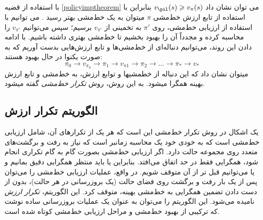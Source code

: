 با استفاده از قضیه \ref{policyimptheorem} می توان نشان داد
 $v_\pil(s) \ge v_{\pi}(s)$
بنابراین با استفاده از تابع ارزش خط‌مشی $\pi$ می\nf توان به یک خط‌مشی بهتر رسید \cite{suttonbook}. می توانیم با استفاده از ارزیابی خط‌مشی، روی $\pi'$ به تخمینی از $v_{\pi'}$ برسیم؛ سپس می‌توانیم
$v_{\pi'}$
    را محاسبه کرده و مجدداً آن را بهبود بخشیم تا خط‌مشی بهتری داشته باشیم. با ادامه دادن این روند، می‌توانیم دنباله‌ای از خط‌مشی‌ها و تابع ارزش‌هایی بدست آوریم که به صورت یکنوا در حال بهبود هستند:
$$\pi_0 \longrightarrow v_{\pi_0} \longrightarrow \pi_1 \longrightarrow v_{\pi{1}} \longrightarrow \pi_2 \longrightarrow \dots \longrightarrow \pi_* \longrightarrow v_*$$
می\nf توان نشان داد که این دنباله از خط\nf مشی\nf ها و توابع ارزش، به خط‌مشی و تابع ارزش بهینه همگرا می\nf شود.
به این روش، روش \textit{تکرار خط‌مشی}  
گفته می\nf شود.
\subsection{الگوریتم تکرار ارزش}
یک اشکال در روش تکرار خط‌مشی این است که هر یک از تکرارهای آن، شامل ارزیابی خط‌مشی است که
به خودی خود یک محاسبه زمان\nf بر است که نیاز به رفت و برگشت‌های متعدد روی مجموعه حالت دارد. اگر
ارزیابی خط‌مشی بصورت گام به گام تکراری انجام شود، همگرایی فقط در حد اتفاق می‌افتد. بنابراین یا باید منتظر همگرایی دقیق بمانیم و یا می‌توانیم قبل تر از آن متوقف شویم. 
در واقع، عملیات ارزیابی خط‌مشی را می‌توان پس از یک بار رفت و برگشت روی فضای حالت (یک بروزرسانی در هر حالت)،  بدون از دست دادن تضمین همگرایی به خط‌مشی بهینه، متوقف کرد. 
این الگوریتم،
\textit{تکرار ارزش}
 نامیده می‌شود. این الگوریتم
را می‌توان به عنوان یک عملیات بروزرسانی ساده نوشت که ترکیبی از بهبود خط‌مشی و
مراحل ارزیابی خط‌مشی کوتاه شده است.



